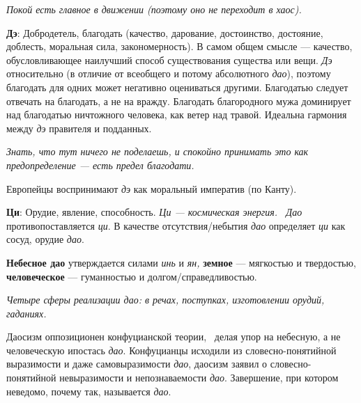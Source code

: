 \documentclass[twoside,a4paper]{article}
\begin{document}
{\itshape
Покой есть главное в движении (поэтому оно не переходит в хаос).}

{
\textbf{Дэ}: {\textquotedbl}Добродетель{\textquotedbl}, {\textquotedbl}благодать{\textquotedbl}
({\textquotedbl}качество{\textquotedbl}, {\textquotedbl}дарование{\textquotedbl},
{\textquotedbl}достоинство{\textquotedbl}, {\textquotedbl}достояние{\textquotedbl},
{\textquotedbl}доблесть{\textquotedbl}, {\textquotedbl}моральная сила{\textquotedbl},
{\textquotedbl}закономерность{\textquotedbl}). В самом общем смысле — качество, обусловливающее наилучший способ
существования существа или вещи. \textit{Дэ} относительно (в отличие от всеобщего и потому абсолютного \textit{дао}),
поэтому {\textquotedbl}благодать{\textquotedbl} для одних может негативно оцениваться другими.
{\textquotedbl}Благодатью{\textquotedbl} следует отвечать на {\textquotedbl}благодать{\textquotedbl}, а не на вражду.
Благодать {\textquotedbl}благородного мужа{\textquotedbl} доминирует над благодатью {\textquotedbl}ничтожного
человека{\textquotedbl}, как ветер над травой. Идеальна гармония между \textit{дэ} правителя и подданных. }

{\itshape
{\textquotedbl}Знать, что тут ничего не поделаешь, и спокойно принимать это как предопределение — есть предел
благодати{\textquotedbl}. }

{
Европейцы воспринимают \textit{дэ} как моральный императив (по Канту).}

{
\textbf{Ци}: {\textquotedbl}Орудие{\textquotedbl}, {\textquotedbl}явление{\textquotedbl},
{\textquotedbl}способность{\textquotedbl}. \textit{Ци — космическая энергия. \ Дао} противопоставляется \textit{ци}. В
качестве {\textquotedbl}отсутствия/небытия{\textquotedbl} \textit{дао} определяет \textit{ци} как сосуд,
{\textquotedbl}орудие{\textquotedbl} \textit{дао}. }

{
\textbf{Небесное дао} утверждается силами \textit{инь} и \textit{ян, }\textbf{земное} —
{\textquotedbl}мягкостью{\textquotedbl} и {\textquotedbl}твердостью{\textquotedbl}, \textbf{человеческое} —
{\textquotedbl}гуманностью{\textquotedbl} и {\textquotedbl}долгом/справедливостью{\textquotedbl}. }

{\itshape
Четыре сферы реализации дао: в речах, поступках, изготовлении орудий, гаданиях.}

{
Даосизм оппозиционен конфуцианской теории, \ делая упор на небесную, а не человеческую ипостась \textit{дао}.
Конфуцианцы исходили из словесно-понятийной выразимости и даже самовыразимости \textit{дао}, даосизм заявил о
словесно-понятийной невыразимости и непознаваемости \textit{дао}. {\textquotedbl}Завершение, при котором неведомо,
почему так, называется \textit{дао}{\textquotedbl}. }
\end{document}
